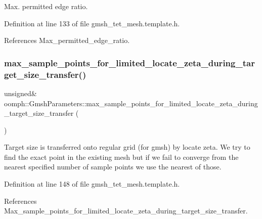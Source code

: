 Max. permitted edge ratio. 



Definition at line 133 of file gmsh\+\_\+tet\+\_\+mesh.\+template.\+h.



References Max\+\_\+permitted\+\_\+edge\+\_\+ratio.

\mbox{\label{classoomph_1_1GmshParameters_a7b7dfff74a8e3183858ecd42b8f1a049}} 
\subsubsection{\texorpdfstring{max\+\_\+sample\+\_\+points\+\_\+for\+\_\+limited\+\_\+locate\+\_\+zeta\+\_\+during\+\_\+target\+\_\+size\+\_\+transfer()}{max\_sample\_points\_for\_limited\_locate\_zeta\_during\_target\_size\_transfer()}}
{\footnotesize\ttfamily unsigned\& oomph\+::\+Gmsh\+Parameters\+::max\+\_\+sample\+\_\+points\+\_\+for\+\_\+limited\+\_\+locate\+\_\+zeta\+\_\+during\+\_\+target\+\_\+size\+\_\+transfer (\begin{DoxyParamCaption}{ }\end{DoxyParamCaption})\hspace{0.3cm}{\ttfamily [inline]}}



Target size is transferred onto regular grid (for gmsh) by locate zeta. We try to find the exact point in the existing mesh but if we fail to converge from the nearest specified number of sample points we use the nearest of those. 



Definition at line 148 of file gmsh\+\_\+tet\+\_\+mesh.\+template.\+h.



References Max\+\_\+sample\+\_\+points\+\_\+for\+\_\+limited\+\_\+locate\+\_\+zeta\+\_\+during\+\_\+target\+\_\+size\+\_\+transfer.

